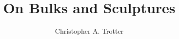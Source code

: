\documentclass[a4paper,11pt]{article}
\begin{document}
\title{On Bulks and Sculptures}

\author{Christopher A. Trotter}

\maketitle


    
\end{document}
